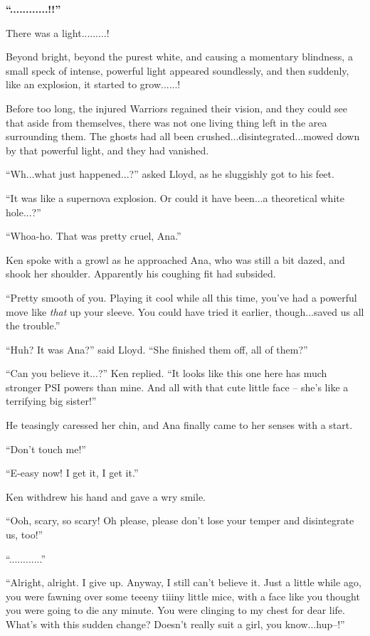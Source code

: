 \documentclass[
]{article}
\begin{document}
\textbf{``............!!''}

\textbf{}There was a light.........!

Beyond bright, beyond the purest white, and causing a momentary
blindness, a small speck of intense, powerful light appeared
soundlessly, and then suddenly, like an explosion, it started to
grow......!

Before too long, the injured Warriors regained their vision, and they
could see that aside from themselves, there was not one living thing
left in the area surrounding them. The ghosts had all been
crushed...disintegrated...mowed down by that powerful light, and they
had vanished.

``Wh...what just happened...?'' asked Lloyd, as he sluggishly got to his
feet.

``It was like a supernova explosion. Or could it have been...a
theoretical white hole...?''

``Whoa-ho. That was pretty cruel, Ana.''

Ken spoke with a growl as he approached Ana, who was still a bit dazed,
and shook her shoulder. Apparently his coughing fit had subsided.

``Pretty smooth of you. Playing it cool while all this time, you've had
a powerful move like \emph{that} up your sleeve. You could have tried it
earlier, though...saved us all the trouble.''

``Huh? It was Ana?'' said Lloyd. ``She finished them off, all of them?''

``Can you believe it...?'' Ken replied. ``It looks like this one here
has much stronger PSI powers than mine. And all with that cute little
face -- she's like a terrifying big sister!''

He teasingly caressed her chin, and Ana finally came to her senses with
a start.

``Don't touch me!''

``E-easy now! I get it, I get it.''

Ken withdrew his hand and gave a wry smile.

``Ooh, scary, so scary! Oh please, please don't lose your temper and
disintegrate us, too!''

``............''

``Alright, alright. I give up. Anyway, I still can't believe it. Just a
little while ago, you were fawning over some teeeny tiiiny little mice,
with a face like you thought you were going to die any minute. You were
clinging to my chest for dear life. What's with this sudden change?
Doesn't really suit a girl, you know...hup--!''
\end{document}

